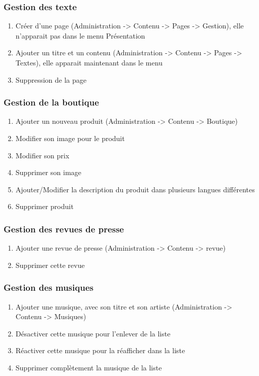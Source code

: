 \documentclass[11pt]{report}
\begin{document}
\subsubsection*{Gestion des texte}
\begin{enumerate}
\item Créer d’une page (Administration -> Contenu -> Pages -> Gestion), elle n'apparait pas dans le menu \og Présentation \fg{}
\item Ajouter un titre et un contenu (Administration -> Contenu -> Pages -> Textes), elle apparait maintenant dans le menu
\item Suppression de la page
\end{enumerate}
\subsubsection*{Gestion de la boutique}
\begin{enumerate}
\item Ajouter un nouveau produit (Administration -> Contenu -> Boutique)
\item Modifier son image pour le produit
\item Modifier son prix
\item Supprimer son image
\item Ajouter/Modifier la description du produit dans plusieurs langues différentes
\item Supprimer produit
\end{enumerate}
\subsubsection*{Gestion des revues de presse}
\begin{enumerate}
\item Ajouter une revue de presse (Administration -> Contenu -> revue)
\item Supprimer cette revue
\end{enumerate}
\subsubsection*{Gestion des musiques}
\begin{enumerate}
\item Ajouter une musique, avec son titre et son artiste (Administration -> Contenu -> Musiques)
\item Désactiver cette musique pour l’enlever de la liste
\item Réactiver cette musique pour la réafficher dans la liste
\item Supprimer complètement la musique de la liste
\end{enumerate}
\end{document}
